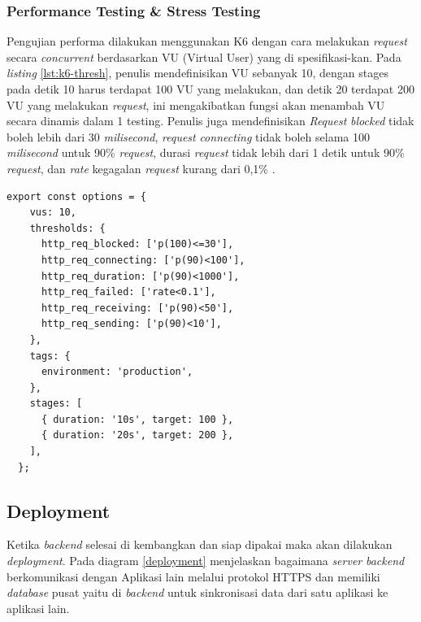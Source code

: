 \subsubsection{Performance Testing \& Stress Testing}
Pengujian performa dilakukan menggunakan K6 dengan cara melakukan \textit{request} secara \textit{concurrent} berdasarkan VU (Virtual User) yang di spesifikasi-kan. Pada \textit{listing} \ref{lst:k6-thresh}, penulis mendefinisikan VU sebanyak 10, dengan stages pada detik 10 harus terdapat 100 VU yang melakukan, dan detik 20 terdapat 200 VU yang melakukan \textit{request}, ini mengakibatkan fungsi akan menambah VU secara dinamis dalam 1 testing. Penulis juga mendefinisikan \textit{Request} \textit{blocked} tidak boleh lebih dari 30 \textit{milisecond}, \textit{request} \textit{connecting} tidak boleh selama 100 \textit{milisecond} untuk 90\% \textit{request}, durasi \textit{request} tidak lebih dari 1 detik untuk 90\% \textit{request}, dan \textit{rate} kegagalan \textit{request} kurang dari 0,1\% \cite{nah2004study}.
\begin{lstlisting}[caption={Konfigurasi dan threshold yang perlu dicapai pada K6},label={lst:k6-thresh}]
  export const options = {
    vus: 10,
    thresholds: {
      http_req_blocked: ['p(100)<=30'],
      http_req_connecting: ['p(90)<100'],
      http_req_duration: ['p(90)<1000'],
      http_req_failed: ['rate<0.1'],
      http_req_receiving: ['p(90)<50'],
      http_req_sending: ['p(90)<10'],
    },
    tags: {
      environment: 'production',
    },
    stages: [
      { duration: '10s', target: 100 },
      { duration: '20s', target: 200 },
    ],
  };
\end{lstlisting}

\newpage

\subsection{Deployment}
Ketika \textit{backend} selesai di kembangkan dan siap dipakai maka akan dilakukan \textit{deployment}.
Pada diagram \ref{deployment} menjelaskan bagaimana \textit{server} \textit{backend} berkomunikasi dengan Aplikasi lain melalui protokol HTTPS dan memiliki \textit{database} pusat yaitu di \textit{backend} untuk sinkronisasi data dari satu aplikasi ke aplikasi lain. 

